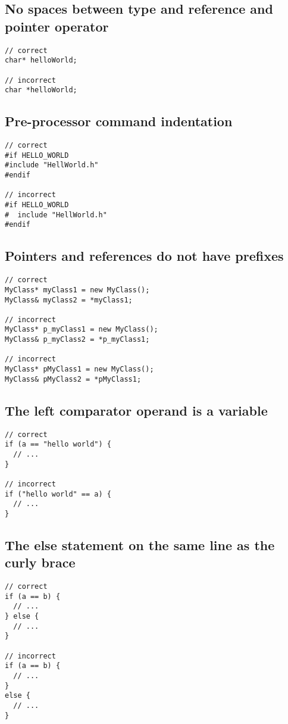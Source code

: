 \documentclass{article}
\begin{document}
\subsection{No spaces between type and reference and pointer operator}

\begin{verbatim}
// correct
char* helloWorld;

// incorrect
char *helloWorld;
\end{verbatim}

\subsection{Pre-processor command indentation}

\begin{verbatim}
// correct
#if HELLO_WORLD
#include "HellWorld.h"
#endif

// incorrect
#if HELLO_WORLD
#  include "HellWorld.h"
#endif
\end{verbatim}

\subsection{Pointers and references do not have prefixes}

\begin{verbatim}
// correct
MyClass* myClass1 = new MyClass();
MyClass& myClass2 = *myClass1;

// incorrect
MyClass* p_myClass1 = new MyClass();
MyClass& p_myClass2 = *p_myClass1;

// incorrect
MyClass* pMyClass1 = new MyClass();
MyClass& pMyClass2 = *pMyClass1;
\end{verbatim}

\subsection{The left comparator operand is a variable}

\begin{verbatim}
// correct
if (a == "hello world") {
  // ...
}

// incorrect
if ("hello world" == a) {
  // ...
}
\end{verbatim}

\subsection{The else statement on the same line as the curly brace}

\begin{verbatim}
// correct
if (a == b) {
  // ...
} else {
  // ...
}

// incorrect
if (a == b) {
  // ...
}
else {
  // ...
}
\end{verbatim}
\end{document}
